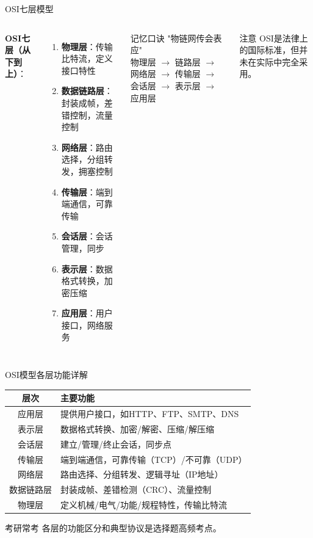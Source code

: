 \documentclass[10pt, aspectratio=169]{beamer}
\begin{document}
\begin{frame}{OSI七层模型}
    \begin{columns}[T]
        \textbf{OSI七层（从下到上）}：
        \begin{enumerate}
            \item \textbf{物理层}：传输比特流，定义接口特性
            \item \textbf{数据链路层}：封装成帧，差错控制，流量控制
            \item \textbf{网络层}：路由选择，分组转发，拥塞控制
            \item \textbf{传输层}：端到端通信，可靠传输
            \item \textbf{会话层}：会话管理，同步
            \item \textbf{表示层}：数据格式转换，加密压缩
            \item \textbf{应用层}：用户接口，网络服务
        \end{enumerate}
        \begin{block}{记忆口诀}
            "物链网传会表应"\\
            \vspace{0.3em}
            \small
            物理层 $\to$ 链路层 $\to$ 网络层 $\to$ 传输层 $\to$ 会话层 $\to$ 表示层 $\to$ 应用层
        \end{block}
        \vspace{0.5em}
        \begin{alertblock}{注意}
            OSI是法律上的国际标准，但并未在实际中完全采用。
        \end{alertblock}
    \end{columns}
\end{frame}

\begin{frame}{OSI模型各层功能详解}
    \begin{table}
        \begin{tabular}{|c|l|}
            \hline
            \textbf{层次} & \textbf{主要功能} \\ \hline
            应用层 & 提供用户接口，如HTTP、FTP、SMTP、DNS \\
            表示层 & 数据格式转换、加密/解密、压缩/解压缩 \\
            会话层 & 建立/管理/终止会话，同步点 \\
            传输层 & 端到端通信，可靠传输（TCP）/不可靠（UDP） \\
            网络层 & 路由选择、分组转发、逻辑寻址（IP地址） \\
            数据链路层 & 封装成帧、差错检测（CRC）、流量控制 \\
            物理层 & 定义机械/电气/功能/规程特性，传输比特流 \\
            \hline
        \end{tabular}
    \end{table}
    \vspace{0.3em}
    \begin{block}{考研常考}
        各层的功能区分和典型协议是选择题高频考点。
    \end{block}
\end{frame}
\end{document}

